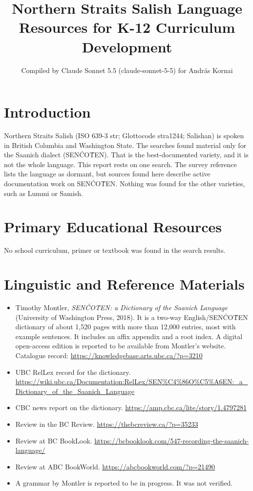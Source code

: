 \documentclass[12pt]{article}
\title{Northern Straits Salish Language Resources for K-12 Curriculum Development}
\author{Compiled by Claude Sonnet 5.5 (claude-sonnet-5-5) for Andr\'as Kornai}
\date{}
\begin{document}
\maketitle

\section{Introduction}
Northern Straits Salish (ISO 639-3 str; Glottocode stra1244; Salishan) is spoken in British Columbia and Washington State. The searches found material only for the Saanich dialect (SEN\'C\!O\!\'T\!EN). That is the best-documented variety, and it is not the whole language. This report rests on one search. The survey reference lists the language as dormant, but sources found here describe active documentation work on SEN\'C\!O\!\'T\!EN. Nothing was found for the other varieties, such as Lummi or Samish.

\section{Primary Educational Resources}
No school curriculum, primer or textbook was found in the search results.

\section{Linguistic and Reference Materials}
\begin{itemize}
\item Timothy Montler, \emph{SEN\'C\!O\!\'T\!EN: a Dictionary of the Saanich Language} (University of Washington Press, 2018). It is a two-way English/SEN\'C\!O\!\'T\!EN dictionary of about 1,520 pages with more than 12,000 entries, most with example sentences. It includes an affix appendix and a root index. A digital open-access edition is reported to be available from Montler's website. Catalogue record: \url{https://knowledgebase.arts.ubc.ca/?p=3210}
\item UBC RelLex record for the dictionary. \url{https://wiki.ubc.ca/Documentation:RelLex/SEN%C4%86O%C5%A6EN:_a_Dictionary_of_the_Saanich_Language}
\item CBC news report on the dictionary. \url{https://amp.cbc.ca/lite/story/1.4797281}
\item Review in the BC Review. \url{https://thebcreview.ca/?p=35233}
\item Review at BC BookLook. \url{https://bcbooklook.com/547-recording-the-saanich-language/}
\item Review at ABC BookWorld. \url{https://abcbookworld.com/?p=21490}
\item A grammar by Montler is reported to be in progress. It was not verified.
\end{itemize}
\end{document}
